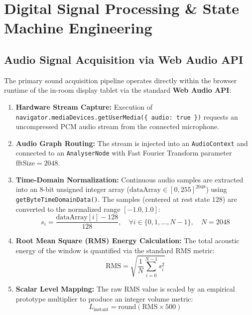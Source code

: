 \documentclass[11pt,a4paper]{article}
\begin{document}
\section{Digital Signal Processing \& State Machine Engineering}

\subsection{Audio Signal Acquisition via Web Audio API}
The primary sound acquisition pipeline operates directly within the browser runtime of the in-room display tablet via the standard \textbf{Web Audio API}:
\begin{enumerate}[leftmargin=*]
    \item \textbf{Hardware Stream Capture:} Execution of \texttt{navigator.mediaDevices.getUserMedia(\{ audio: true \})} requests an uncompressed PCM audio stream from the connected microphone.
    \item \textbf{Audio Graph Routing:} The stream is injected into an \texttt{AudioContext} and connected to an \texttt{AnalyserNode} with Fast Fourier Transform parameter $\text{fftSize} = 2048$.
    \item \textbf{Time-Domain Normalization:} Continuous audio samples are extracted into an 8-bit unsigned integer array ($\text{dataArray} \in [0, 255]^{2048}$) using \texttt{getByteTimeDomainData()}. The samples (centered at rest state $128$) are converted to the normalized range $[-1.0, 1.0]$:
    \begin{equation}
        s_i = \frac{\text{dataArray}[i] - 128}{128}, \quad \forall i \in \{0, 1, \dots, N-1\}, \quad N=2048
    \end{equation}
    \item \textbf{Root Mean Square (RMS) Energy Calculation:} The total acoustic energy of the window is quantified via the standard RMS metric:
    \begin{equation}
        \text{RMS} = \sqrt{\frac{1}{N} \sum_{i=0}^{N-1} s_i^2}
    \end{equation}
    \item \textbf{Scalar Level Mapping:} The raw RMS value is scaled by an empirical prototype multiplier to produce an integer volume metric:
    \begin{equation}
        L_{\text{instant}} = \text{round}(\text{RMS} \times 500)
    \end{equation}
\end{enumerate}
\end{document}
